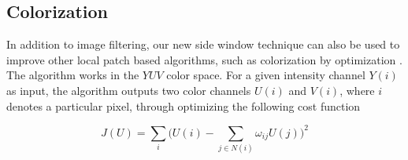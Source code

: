 \documentclass[10pt,twocolumn,letterpaper]{article}
\begin{document}
\subsection{Colorization}
In addition to image filtering, our new side window technique can also be used to improve other local patch based algorithms, such as colorization by optimization \cite{colorization}. The algorithm works in the $YUV$ color space. For  a given intensity channel $Y(i)$ as input, the algorithm outputs two color channels $U(i)$ and $V(i)$, where $i$ denotes a particular pixel, through optimizing the following cost function 

\begin{equation}\label{optimization}
J(U) = \mathop{\sum}_{i}\Big(U(i) - \sum_{j\in{N(i)}}\omega_{ij}U(j)\Big)^2
\end{equation}
\end{document}
